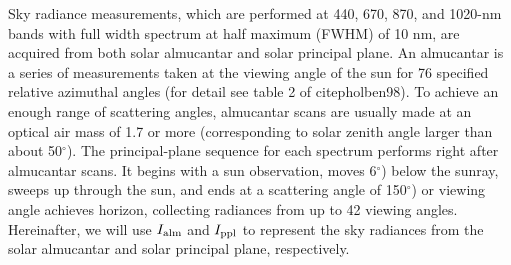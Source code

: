 Sky radiance measurements, which are performed at 440, 670, 870, and 1020-nm
bands with full width spectrum at half maximum (FWHM) of 10 nm, are acquired
from both solar almucantar and solar principal plane. An almucantar is a series 
of measurements taken at the viewing angle of the sun for 76 specified relative 
azimuthal angles (for detail see table 2 of citep{holben98}). To achieve an
enough range of scattering angles, almucantar scans are usually made at an
optical air mass of 1.7 or more (corresponding to solar zenith angle larger
than about 50$^\circ$). The principal-plane sequence for each spectrum performs
right after almucantar scans. It begins with a sun observation, moves 6$^\circ$)
below the sunray, sweeps up through the sun, and ends at a scattering angle of
150$^\circ$) or viewing angle achieves horizon, collecting radiances from up to
42 viewing angles. Hereinafter, we will use $I_\text{alm}$ and $I_\text{ppl}$ to represent the sky
radiances from the solar almucantar and solar principal plane, respectively.

